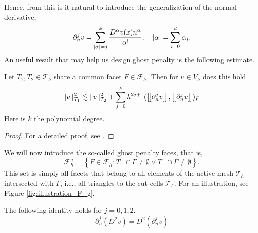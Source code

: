 Hence, from this is it natural to introduce the generalization of the normal derivative, \[
\partial _{n}^{j} v = \sum_{\left\lvert  \alpha   \right\rvert =j }^{k} \frac{D ^{\alpha }v( x) n^{\alpha }}{\alpha !}, \quad \left\lvert  \alpha   \right\rvert = \sum_{i=0}^{d} \alpha_{i}.
\]
An useful result that may help us design ghost penalty is the following estimate.

\begin{lemma}
    \label{lemma:bi_local_facet_estimate}
    Let $T_{1}, T_{2} \in  \mathcal{T} _{h} $ share a common facet $F \in \mathcal{F}_{h} $. Then for $v_{} \in  V_{h}$  does this hold \[
    \| v \|_{ T_{1} }^{  2}  \lesssim  \| v \|_{ T_{2} }^{2  }  + \sum_{j=0}^{k}  h^{2j +1} ( \left[\!\left[  \partial _{n}^{j} v \right]\!\right], \left[\!\left[  \partial _{n}^{j} v \right]\!\right]    )_{F}
    \]
        Here is $k$ the polynomial degree.
\end{lemma}

\begin{proof}
    For a detailed proof, see \cite{gurkan2019stabilized}.
\end{proof}

We will now introduce the so-called ghost penalty faces, that is, \[
\mathcal{F} ^{g}_{h} = \left\{ F\in \mathcal{F} _{h} : T^{+}\cap \Gamma \neq \emptyset  \vee T^{-}\cap \Gamma \neq \emptyset  \right\}.
\]
This set is simply all facets that belong to all elements of the active mesh $\mathcal{T} _{h}$  intersected with $\Gamma $, i.e., all triangles to the cut cells $\mathcal{T} _{\Gamma }$. For an illustration, see Figure \ref{fig:illustration_F_g}.




\begin{proposition}
    \label{prop:hessian_change}
    The following identity holds for $j=0,1,2$.
    $$\partial ^{j}_{n} (D^2v) = D^2 ( \partial ^{j}_{n} v)  $$
\end{proposition}

